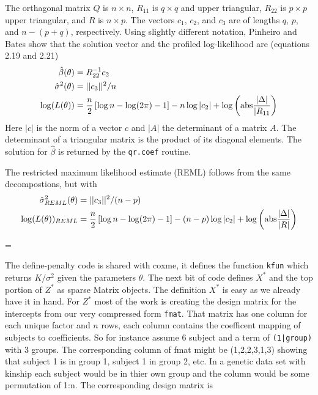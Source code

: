 \documentclass{article}
\begin{document}
The orthagonal matrix $Q$ is $n\times n$, $R_{11}$ is $q \times q$ and upper 
triangular, $R_{22}$ is $p \times p$ upper triangular, and $R$ is $n \times p$.
The vectors $c_1$, $c_2$, and $c_3$ are of lengths $q$, $p$, and
$n- (p+q)$, respectively.
Using slightly different notation, Pinheiro and Bates show
that the solution vector and the profiled log-likelihood are (equations 2.19
and 2.21)
\begin{align}
  \hat\beta(\theta) &= R_{22}^{-1} c_2  \label{bhat}\\
  \hat\sigma^2(\theta) &= ||c_3||^2/n  \label{sighat}\\
  \log(L(\theta)) &= \frac{n}{2}\left[ \log n - \log(2\pi) -1 \right] -
    n\log |c_2| + \log\left( {\rm abs} \frac{|\Delta|}{|R_{11}} \right) 
     \label{loghat}
\end{align}
Here $|c|$ is the norm of a vector $c$  and $|A|$ the determinant of a matrix
$A$.  The determinant of a triangular matrix is the product of its
diagonal elements.  The solution for $\hat\beta$ is returned by the
\Verb!qr.coef! routine.

The restricted maximum likelihood estimate (REML) follows from the same
decompostions, but with
\begin{align}
  \hat\sigma^2_{REML}(\theta) &= ||c_3||^2/(n-p)  \label{sighatREML}\\
  \log(L(\theta))_{REML} &= \frac{n}{2}\left[\log n - \log(2\pi) -1\right] -
    (n-p)\log |c_2| + \log \left( {\rm abs} \frac{|\Delta|}{|R|} \right) 
     \label{loghatREML}
\end{align}


\begin{nwchunk}
=
\end{nwchunk}

The define-penalty code is shared with coxme, it defines the
function \Verb!kfun! which returns $K/\sigma^2$ given the parameters $\theta$.
The next bit of code defines $X^*$ and the top portion of $Z^*$
as sparse Matrix objects.
The definition $X^*$ is easy as we already have it in hand.  
For $Z^*$ most of the work is creating the design matrix for the
intercepts from our very compressed form \Verb!fmat!.
That matrix has one column for each unique factor and $n$ rows,
each column contains the coefficent mapping of subjects to coefficients.
So for instance assume 6 subject and a term of \Verb!(1|group)! with 3
groups.
The corresponding column of fmat might be (1,2,2,3,1,3) showing that
subject 1 is in group 1, subject 1 in group 2, etc.  
In a genetic data set with kinship each subject would be in thier
own group and the column would be some permutation of 1:n.
The corresponding design matrix is
\end{document}
